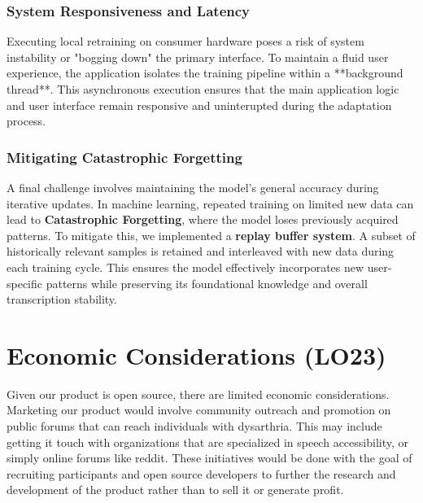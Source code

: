 \documentclass{article}
\begin{document}
\subsubsection{System Responsiveness and Latency}
Executing local retraining on consumer hardware poses a risk of system instability or "bogging down" the primary interface. To maintain a fluid user experience, the application isolates the training pipeline within a **background thread**. This asynchronous execution ensures that the main application logic and user interface remain responsive and uninterupted during the adaptation process.

\subsubsection{Mitigating Catastrophic Forgetting}
A final challenge involves maintaining the model’s general accuracy during iterative updates. In machine learning, repeated training on limited new data can lead to \textbf{Catastrophic Forgetting}, where the model loses previously acquired patterns. To mitigate this, we implemented a \textbf{replay buffer system}. A subset of historically relevant samples is retained and interleaved with new data during each training cycle. This ensures the model effectively incorporates new user-specific patterns while preserving its foundational knowledge and overall transcription stability.

\section{Economic Considerations (LO23)}


Given our product is open source, there are limited economic considerations. Marketing our product would involve community outreach and promotion on public forums that can reach individuals with dysarthria. This may include getting it touch with organizations that are specialized in speech accessibility, or simply online forums like reddit. These initiatives would be done with the goal of recruiting participants and open source developers to further the research and development of the product rather than to sell it or generate profit.  
\end{document}
